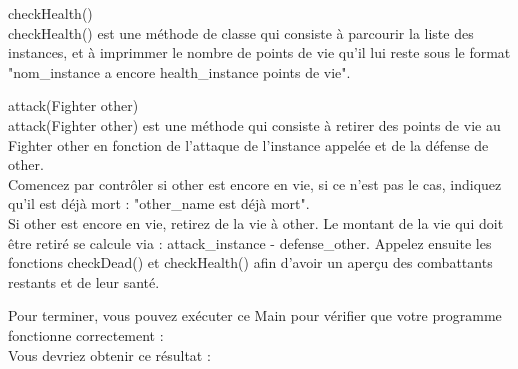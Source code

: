 \begin{Exercice} checkHealth()\\
    checkHealth() est une méthode de classe qui consiste à parcourir la liste des instances, et à imprimmer le nombre de points de vie qu'il lui reste sous le format "nom\_instance a encore health\_instance points de vie". 

\begin{solution}
	
\end{solution}
\end{Exercice}

\begin{Exercice} attack(Fighter other)\\
    attack(Fighter other) est une méthode qui consiste à retirer des points de vie au Fighter other en fonction de l'attaque de l'instance appelée et de la défense de other. \\
    
    Comencez par contrôler si other est encore en vie, si ce n'est pas le cas, indiquez qu'il est déjà mort : "other\_name est déjà mort". \\
    
     Si other est encore en vie, retirez de la vie à other. Le montant de la vie qui doit être retiré se calcule via : attack\_instance - defense\_other. Appelez ensuite les fonctions checkDead() et checkHealth() afin d'avoir un aperçu des combattants restants et de leur santé.
    


\begin{solution}
	
\end{solution}
\end{Exercice}


Pour terminer, vous pouvez exécuter ce Main pour vérifier que votre programme fonctionne correctement : \\



Vous devriez obtenir ce résultat : \\




